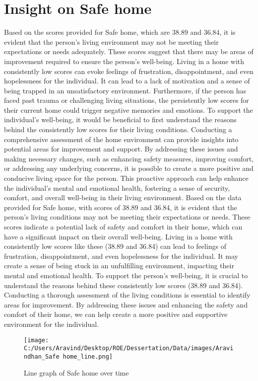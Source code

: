 \documentclass[10pt, a4paper]{article}%
\begin{document}
\section{Insight on Safe home}%
\label{sec:InsightonSafehome}%
Based on the scores provided for Safe home, which are 38.89 and 36.84, it is evident that the person's living environment may not be meeting their expectations or needs adequately. These scores suggest that there may be areas of improvement required to ensure the person's well{-}being. Living in a home with consistently low scores can evoke feelings of frustration, disappointment, and even hopelessness for the individual. It can lead to a lack of motivation and a sense of being trapped in an unsatisfactory environment. Furthermore, if the person has faced past trauma or challenging living situations, the persistently low scores for their current home could trigger negative memories and emotions.\newline%
\newline%
To support the individual's well{-}being, it would be beneficial to first understand the reasons behind the consistently low scores for their living conditions. Conducting a comprehensive assessment of the home environment can provide insights into potential areas for improvement and support. By addressing these issues and making necessary changes, such as enhancing safety measures, improving comfort, or addressing any underlying concerns, it is possible to create a more positive and conducive living space for the person. This proactive approach can help enhance the individual's mental and emotional health, fostering a sense of security, comfort, and overall well{-}being in their living environment.\newline%
\newline%
Based on the data provided for Safe home, with scores of 38.89 and 36.84, it is evident that the person's living conditions may not be meeting their expectations or needs. These scores indicate a potential lack of safety and comfort in their home, which can have a significant impact on their overall well{-}being. Living in a home with consistently low scores like these (38.89 and 36.84) can lead to feelings of frustration, disappointment, and even hopelessness for the individual. It may create a sense of being stuck in an unfulfilling environment, impacting their mental and emotional health.\newline%
\newline%
To support the person's well{-}being, it is crucial to understand the reasons behind these consistently low scores (38.89 and 36.84). Conducting a thorough assessment of the living conditions is essential to identify areas for improvement. By addressing these issues and enhancing the safety and comfort of their home, we can help create a more positive and supportive environment for the individual.%


\begin{figure}[H]%
\centering%
\texttt{[image: C:/Users/Aravind/Desktop/ROE/Dessertation/Data/images/Aravindhan\_Safe home\_line.png]}%
\caption{Line graph of Safe home over time}%
\end{figure}

%
\end{document}

